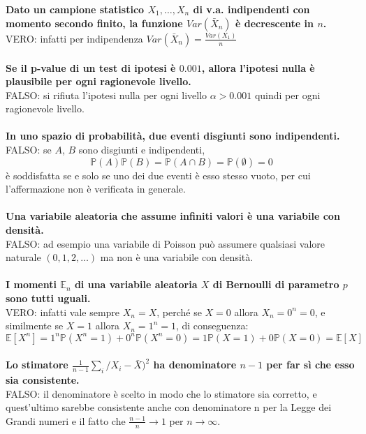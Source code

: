 \noindent \textbf{Dato un campione statistico $X_1, \ldots, X_n$ di v.a. indipendenti con momento secondo finito, la funzione $Var(\bar{X}_n)$ è decrescente in $n$.}\\
VERO: infatti per indipendenza $Var(\bar{X}_n) = \frac{Var(X_1)}{n}$\\\\

\noindent \textbf{Se il p-value di un test di ipotesi è $0.001$, allora l’ipotesi nulla è plausibile per ogni ragionevole livello.}\\
FALSO: si rifiuta l’ipotesi nulla per ogni livello $\alpha > 0.001$ quindi per ogni ragionevole livello. \\\\

\noindent \textbf{In uno spazio di probabilità, due eventi disgiunti sono indipendenti.} \\
FALSO: se $A$, $B$ sono disgiunti e indipendenti,
\begin{equation*}
	\mathbb{P}(A)\mathbb{P}(B) = \mathbb{P}(A \cap B) = \mathbb{P}(\emptyset)=0
\end{equation*}
è soddisfatta se e solo se uno dei due eventi è esso stesso vuoto, per cui l’affermazione
non è verificata in generale.\\\\

\noindent \textbf{Una variabile aleatoria che assume infiniti valori è una variabile con densità.}\\
FALSO: ad esempio una variabile di Poisson può assumere qualsiasi valore naturale $(0, 1, 2, \ldots)$ ma non è una variabile con densità.\\\\

\noindent \textbf{I momenti $\mathbb{E}_n$ di una variabile aleatoria $X$ di Bernoulli di parametro $p$ sono tutti uguali.}\\
VERO: infatti vale sempre $X_n = X$, perché se $X = 0$ allora $X_n = 0^n = 0$, e similmente se $X = 1$ allora $X_n = 1^n = 1$, di conseguenza:
\begin{equation*}
	\mathbb{E}[X^n] = 1^n \mathbb{P}(X^n = 1) + 0 ^n \mathbb{P}(X^n=0) = 1 \mathbb{P}(X=1) + 0 \mathbb{P}(X=0) = \mathbb{E}[X]
\end{equation*}\\

\noindent \textbf{Lo stimatore $\frac{1}{n-1}\sum_{i}/X_i - \bar{X})^2$ ha denominatore $n-1$ per far sì che esso sia consistente.}\\
FALSO: il denominatore è scelto in modo che lo stimatore sia corretto, e quest'ultimo sarebbe consistente anche con denominatore n per la Legge dei Grandi numeri e il fatto che $\frac{n-1}{n} \to 1$ per $n \to \infty$.\\\\

